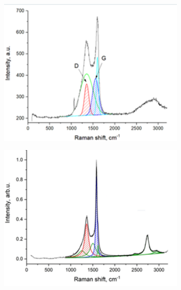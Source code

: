 \begin{figure}[H]
	\centering
	\includegraphics[width=0.8\textwidth]{media/chem2/image101}
	\caption*{}
\end{figure}

\begin{figure}[H]
	\centering
	\includegraphics[width=0.8\textwidth]{media/chem2/image102}
	\caption*{}
\end{figure}


